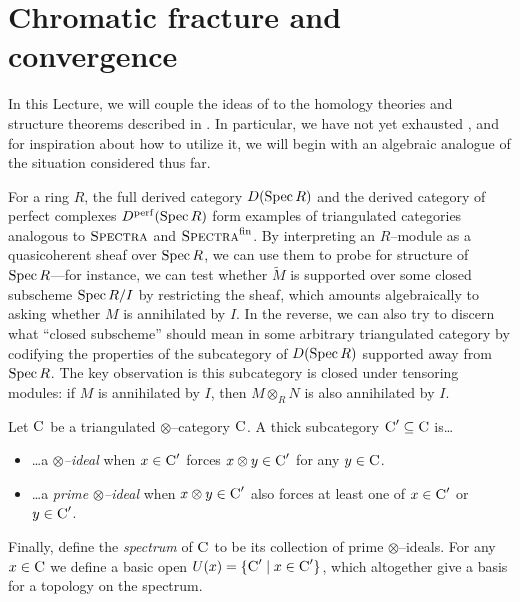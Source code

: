 \section{Chromatic fracture and convergence}\label{ChromaticLocalizationSection}

In this Lecture, we will couple the ideas of  to the homology theories and structure theorems described in .  In particular, we have not yet exhausted , and for inspiration about how to utilize it, we will begin with an algebraic analogue of the situation considered thus far.

For a ring \(R\), the full derived category \(D(\operatorname{Spec} R)\) and the derived category of perfect complexes \(D^{\mathrm{perf}}(\operatorname{Spec} R)\) form examples of triangulated categories analogous to \(\normalfont\textsc{Spectra}\) and \(\normalfont\textsc{Spectra}^{\mathrm{fin}}\).  By interpreting an \(R\)--module as a quasicoherent sheaf over \(\operatorname{Spec} R\), we can use them to probe for structure of \(\operatorname{Spec} R\)---for instance, we can test whether \(\widetilde M\) is supported over some closed subscheme \(\operatorname{Spec} R/I\) by restricting the sheaf, which amounts algebraically to asking whether \(M\) is annihilated by \(I\).  In the reverse, we can also try to discern what ``closed subscheme'' should mean in some arbitrary triangulated category by codifying the properties of the subcategory of \(D(\operatorname{Spec} R)\) supported away from \(\operatorname{Spec} R\).  The key observation is this subcategory is closed under tensoring modules: if \(M\) is annihilated by \(I\), then \(M \otimes_R N\) is also annihilated by \(I\).

\begin{definition}
Let \(\normalfont\textsc{C}\) be a triangulated \(\otimes\)--category \(\normalfont\textsc{C}\).  A thick subcategory \(\normalfont\textsc{C}' \subseteq \normalfont\textsc{C}\) is\ldots
\begin{itemize}
\item \ldots a \textit{\(\otimes\)--ideal} when \(x \in \normalfont\textsc{C}'\) forces \(x \otimes y \in \normalfont\textsc{C}'\) for any \(y \in \normalfont\textsc{C}\).
\item \ldots a \textit{prime \(\otimes\)--ideal} when \(x \otimes y \in \normalfont\textsc{C}'\) also forces at least one of \(x \in \normalfont\textsc{C}'\) or \(y \in \normalfont\textsc{C}'\).
\end{itemize}
Finally, define the \textit{spectrum} of \(\normalfont\textsc{C}\) to be its collection of prime \(\otimes\)--ideals.  For any \(x \in \normalfont\textsc{C}\) we define a basic open \(U(x) = \{\normalfont\textsc{C}' \mid x \in \normalfont\textsc{C}'\}\), which altogether give a basis for a topology on the spectrum.
\end{definition}

